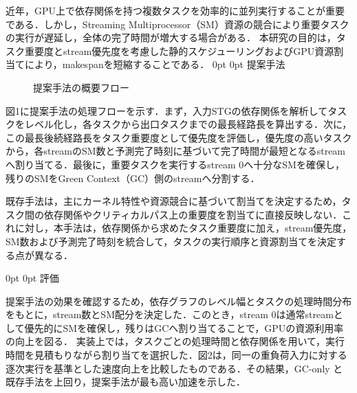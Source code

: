 \documentclass[a4paper,11pt,lualatex,ja=standard]{bxjsarticle}
\makeatletter
\renewcommand{\section}{\@startsection{section}{1}{\z@}%
   {0pt}%
   {0pt}%
   {\reset@font\large\bfseries}}   %
\makeatother
\begin{document}
近年，GPU上で依存関係を持つ複数タスクを効率的に並列実行することが重要である．しかし，Streaming Multiprocessor（SM）資源の競合により重要タスクの実行が遅延し，全体の完了時間が増大する場合がある．
本研究の目的は，タスク重要度とstream優先度を考慮した静的スケジューリングおよびGPU資源割当てにより，makespanを短縮することである．
\section{提案手法}

\begin{figure}[H]
\centering
{}
\caption{提案手法の概要フロー}
\label{fig:proposal-flow}
\end{figure}

図1に提案手法の処理フローを示す．まず，入力STGの依存関係を解析してタスクをレベル化し，各タスクから出口タスクまでの最長経路長を算出する．次に，この最長後続経路長をタスク重要度として優先度を評価し，優先度の高いタスクから，各streamのSM数と予測完了時刻に基づいて完了時間が最短となるstreamへ割り当てる．最後に，重要タスクを実行するstream 0へ十分なSMを確保し，残りのSMをGreen Context（GC）側のstreamへ分割する．

既存手法は，主にカーネル特性や資源競合に基づいて割当てを決定するため，タスク間の依存関係やクリティカルパス上の重要度を割当てに直接反映しない．これに対し，本手法は，依存関係から求めたタスク重要度に加え，stream優先度，SM数および予測完了時刻を統合して，タスクの実行順序と資源割当てを決定する点が異なる．

\section{評価}

提案手法の効果を確認するため，依存グラフのレベル幅とタスクの処理時間分布をもとに，stream数とSM配分を決定した．このとき，stream 0は通常streamとして優先的にSMを確保し，残りはGCへ割り当てることで，GPUの資源利用率の向上を図る．
実装上では，タスクごとの処理時間と依存関係を用いて，実行時間を見積もりながら割り当てを選択した．図2は，同一の重負荷入力に対する逐次実行を基準とした速度向上を比較したものである．その結果，GC-only と既存手法を上回り，提案手法が最も高い加速を示した．
\end{document}
